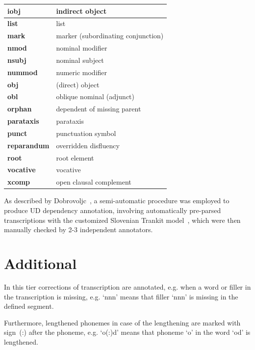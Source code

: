 \documentclass[a4paper,oneside,12pt]{article}
\begin{document}
\begin{samepage}
\begin{longtable}{|l|l|}
    \textbf{iobj}       & indirect object                    \\ \hline
    \textbf{list}       & list                               \\ \hline
    \textbf{mark}       & marker (subordinating conjunction) \\ \hline
    \textbf{nmod}       & nominal modifier                   \\ \hline
    \textbf{nsubj}      & nominal subject                    \\ \hline
    \textbf{nummod}     & numeric modifier                   \\ \hline
    \textbf{obj}        & (direct) object                    \\ \hline
    \textbf{obl}        & oblique nominal (adjunct)          \\ \hline
    \textbf{orphan}     & dependent of missing parent        \\ \hline
    \textbf{parataxis}  & parataxis                          \\ \hline
    \textbf{punct}      & punctuation symbol                 \\ \hline
    \textbf{reparandum} & overridden disfluency              \\ \hline
    \textbf{root}       & root element                       \\ \hline
    \textbf{vocative}   & vocative                           \\ \hline
    \textbf{xcomp}      & open clausal complement            \\ \hline
  \end{longtable}
\end{samepage}
As described by Dobrovoljc~\cite{dobrovoljc2024extending}, a semi-automatic
procedure was employed to produce UD dependency annotation, involving
automatically pre-parsed transcriptions with the customized Slovenian Trankit
model~\cite{krsnikdobrovoljc}, which were then manually checked by 2-3
independent annotators.
\section{Additional}
In this tier corrections of transcription are annotated, e.g. when a word or
filler in the transcription is missing, e.g. `nnn' means that filler `nnn' is
missing in the defined segment.

Furthermore, lengthened phonemes in case of the lengthening are marked with
sign~(:) after the phoneme, e.g. `o(:)d' means that phoneme `o' in the word `od'
is lengthened.
\end{document}
